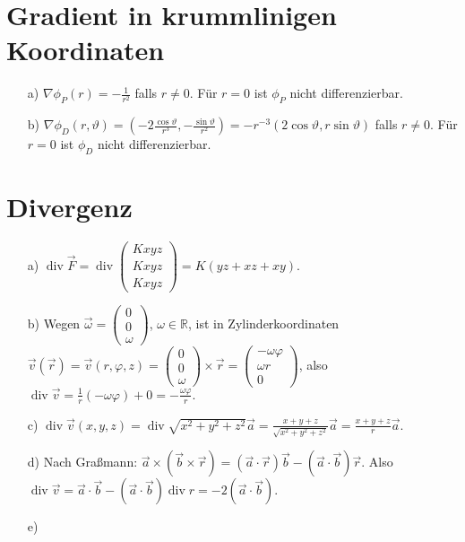 \documentclass[11pt]{article}
\theoremstyle{plain}
\theoremstyle{definition}
\theoremstyle{remark}
\newcommand{\R}{\mathbb{R}}
\newcommand{\D}{\displaystyle}
\newcommand{\ph}{\varphi}
\renewcommand{\div}{\operatorname{div}}
\begin{document}
\section{Gradient in krummlinigen Koordinaten}

\begin{itemize}
\item[a)] 
$ \D \nabla \phi_P (r) = -\frac{1}{r^2} $ falls $ r \neq 0 $. Für $ r=0 $ ist $ \phi_P $ nicht differenzierbar. 
\item[b)] 
$ \D \nabla \phi_D (r,\vartheta) = \left( -2 \frac{\cos \vartheta}{r^3} , - \frac{\sin \vartheta}{r^2} \right) = -r^{-3} (2\cos \vartheta,r\sin\vartheta) $ falls $ r \neq 0 $. Für $ r=0 $ ist $ \phi_D $ nicht differenzierbar. 
\end{itemize}


\section{Divergenz}

\begin{itemize}
\item[a)] 
$ \div \vec{F} 
= \div 
	\begin{pmatrix} Kxyz \\ Kxyz \\ Kxyz \end{pmatrix} 
= K ( yz + xz + xy ). $ 
\item[b)] 
Wegen $ \vec{\omega} = \begin{pmatrix} 0 \\ 0 \\ \omega \end{pmatrix} $, 
$ \omega \in \R $, ist in Zylinderkoordinaten $ \vec{v} (\vec{r}) = \vec v (r,\ph,z)
= \begin{pmatrix} 0 \\ 0 \\ \omega \end{pmatrix} \times \vec{r} 
= \begin{pmatrix} - \omega \ph \\ \omega r \\ 0 \end{pmatrix} $, also 
$ \div \vec v 
= \frac{1}{r} (- \omega \ph) +0 = - \frac{\omega \ph}{r}. $ 
\item[c)] 
$ \div \vec{v} (x,y,z) 
= \div \sqrt{x^2+y^2+z^2} \vec{a} 
= \frac{x+y+z}{\sqrt{x^2+y^2+z^2}} \vec{a} 
= \frac{x+y+z}{r} \vec{a}. $ 
\item[d)] 
Nach Graßmann: $ \vec a \times (\vec b \times \vec r) = (\vec a \cdot \vec r) \vec b - (\vec a \cdot \vec b) \vec r $. 
Also $ \div \vec{v} 
= \vec a \cdot \vec b - (\vec a \cdot \vec b) \div r = -2 (\vec a \cdot \vec b). $ 
\item[e)]  

\end{itemize}
\end{document}
